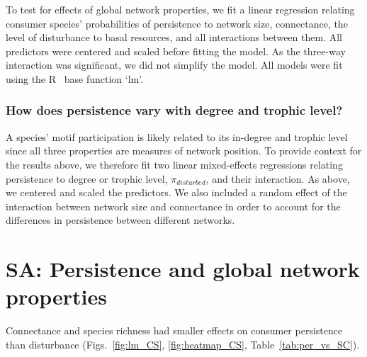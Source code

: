 \documentclass[12pt]{article}
\begin{document}
\begin{spacing}{2.0}
            To test for effects of global network properties, we fit a linear regression relating consumer species' probabilities of persistence to network size, connectance, the level of disturbance to basal resources, and all interactions between them. 
            All predictors were centered and scaled before fitting the model. 
            As the three-way interaction was significant, we did not simplify the model.
            All models were fit using the R~\citep{R} base function `lm'.

                  
        \subsubsection{How does persistence vary with degree and trophic level?}
    
            A species’ motif participation is likely related to its in-degree and trophic level since all three properties are measures of network position. To provide context for the results above, we therefore fit two linear mixed-effects regressions relating persistence to degree or trophic level, $\pi_{disturbed}$, and their interaction. As above, we centered and scaled the predictors. We also included a random effect of the interaction between network size and connectance in order to account for the differences in persistence between different networks.
                

\section{SA: Persistence and global network properties}

    Connectance and species richness had smaller effects on consumer persistence than disturbance (Figs.~\ref{fig:lm_CS}, \ref{fig:heatmap_CS}, Table~\ref{tab:per_vs_SC}).



\end{spacing}
\end{document}
